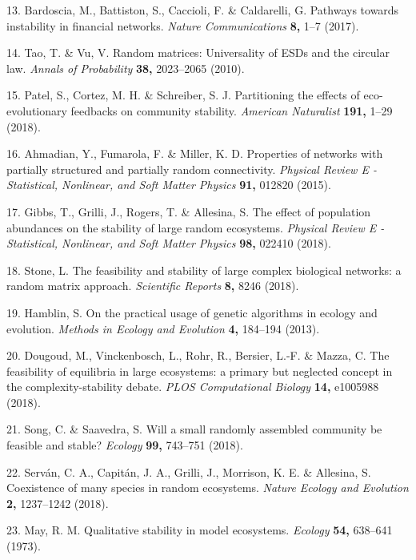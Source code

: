 \documentclass[]{article}
\begin{document}
\hypertarget{ref-Bardoscia2017}{}
13. Bardoscia, M., Battiston, S., Caccioli, F. \& Caldarelli, G.
Pathways towards instability in financial networks. \emph{Nature
Communications} \textbf{8,} 1--7 (2017).

\hypertarget{ref-Tao2010}{}
14. Tao, T. \& Vu, V. Random matrices: Universality of ESDs and the
circular law. \emph{Annals of Probability} \textbf{38,} 2023--2065
(2010).

\hypertarget{ref-Patel2018}{}
15. Patel, S., Cortez, M. H. \& Schreiber, S. J. Partitioning the
effects of eco-evolutionary feedbacks on community stability.
\emph{American Naturalist} \textbf{191,} 1--29 (2018).

\hypertarget{ref-Ahmadian2015}{}
16. Ahmadian, Y., Fumarola, F. \& Miller, K. D. Properties of networks
with partially structured and partially random connectivity.
\emph{Physical Review E - Statistical, Nonlinear, and Soft Matter
Physics} \textbf{91,} 012820 (2015).

\hypertarget{ref-Gibbs2017}{}
17. Gibbs, T., Grilli, J., Rogers, T. \& Allesina, S. The effect of
population abundances on the stability of large random ecosystems.
\emph{Physical Review E - Statistical, Nonlinear, and Soft Matter
Physics} \textbf{98,} 022410 (2018).

\hypertarget{ref-Stone2017}{}
18. Stone, L. The feasibility and stability of large complex biological
networks: a random matrix approach. \emph{Scientific Reports}
\textbf{8,} 8246 (2018).

\hypertarget{ref-Hamblin2013}{}
19. Hamblin, S. On the practical usage of genetic algorithms in ecology
and evolution. \emph{Methods in Ecology and Evolution} \textbf{4,}
184--194 (2013).

\hypertarget{ref-Dougoud2018}{}
20. Dougoud, M., Vinckenbosch, L., Rohr, R., Bersier, L.-F. \& Mazza, C.
The feasibility of equilibria in large ecosystems: a primary but
neglected concept in the complexity-stability debate. \emph{PLOS
Computational Biology} \textbf{14,} e1005988 (2018).

\hypertarget{ref-Song2018}{}
21. Song, C. \& Saavedra, S. Will a small randomly assembled community
be feasible and stable? \emph{Ecology} \textbf{99,} 743--751 (2018).

\hypertarget{ref-Servan2018}{}
22. Serván, C. A., Capitán, J. A., Grilli, J., Morrison, K. E. \&
Allesina, S. Coexistence of many species in random ecosystems.
\emph{Nature Ecology and Evolution} \textbf{2,} 1237--1242 (2018).

\hypertarget{ref-May1973}{}
23. May, R. M. Qualitative stability in model ecosystems. \emph{Ecology}
\textbf{54,} 638--641 (1973).
\end{document}

